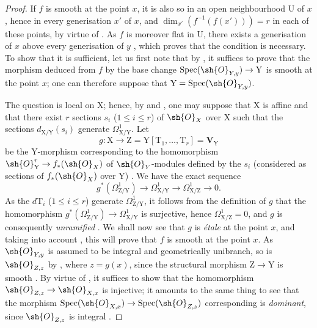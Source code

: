 \begin{proof}
If $f$ is smooth at the point $x$, it is also so in an open neighbourhood $\mathrm{U}$ of $x$, hence in every generisation $x'$ of $x$, and $\dim_{x'}(f^{-1}(f(x')))=r$ in each of these points, by virtue of .
As $f$ is moreover flat in $\mathrm{U}$, there exists a generisation of $x$ above every generisation of $y$ , which proves that the condition is necessary.
To show that it is sufficient, let us first note that by , it suffices to prove that the morphism deduced from $f$ by the base change $\operatorname{Spec}(\sh{O}_{Y,y})\to\mathrm{Y}$ is smooth at the point $x$; one can therefore suppose that $\mathrm{Y}=\operatorname{Spec}(\sh{O}_{Y,y})$.

The question is local on $\mathrm{X}$; hence, by  and , one may suppose that $\mathrm{X}$ is affine and that there exist $r$ sections $s_i$ ($1\leq i\leq r$) of $\sh{O}_X$ over $\mathrm{X}$ such that the sections $d_{\mathrm{X}/\mathrm{Y}}(s_i)$ generate $\Omega^1_{\mathrm{X}/\mathrm{Y}}$.
Let
\[
  g:\mathrm{X}\to\mathrm{Z}=\mathrm{Y}[\mathrm{T}_1,\ldots,\mathrm{T}_r]=\mathbf{V}_{\mathrm{Y}}
\]
be the $\mathrm{Y}$-morphism corresponding to the homomorphism $\sh{O}_{\mathrm{Y}}^r\to f_*(\sh{O}_X)$ of $\sh{O}_Y$-modules defined by the $s_i$ (considered as sections of $f_*(\sh{O}_X)$ over $\mathrm{Y}$) .
We have the exact sequence 
\[
  g^*(\Omega^1_{\mathrm{Z}/\mathrm{Y}})\to\Omega^1_{\mathrm{X}/\mathrm{Y}}\to\Omega^1_{\mathrm{X}/\mathrm{Z}}\to 0.
\]
As the $d\mathrm{T}_i$ ($1\leq i\leq r$) generate $\Omega^1_{\mathrm{Z}/\mathrm{Y}}$, it follows from the definition of $g$ that the homomorphism $g^*(\Omega^1_{\mathrm{Z}/\mathrm{Y}})\to\Omega^1_{\mathrm{X}/\mathrm{Y}}$ is surjective, hence $\Omega^1_{\mathrm{X}/\mathrm{Z}}=0$, and $g$ is consequently \emph{unramified} .
We shall now see that $g$ is \emph{\'etale} at the point $x$, and taking into account , this will prove that $f$ is smooth at the point $x$.
As $\sh{O}_{Y,y}$ is assumed to be integral and geometrically
unibranch, so is $\sh{O}_{Z,z}$ by , where $z=g(x)$, since the structural morphism $\mathrm{Z}\to\mathrm{Y}$ is smooth .
By virtue of , it suffices to show that the homomorphism $\sh{O}_{Z,z}\to\sh{O}_{X,x}$ is injective; it amounts to the same thing to see that the morphism $\operatorname{Spec}(\sh{O}_{X,x})\to\operatorname{Spec}(\sh{O}_{Z,z})$ corresponding is \emph{dominant}, since $\sh{O}_{Z,z}$ is integral .

\end{proof}
